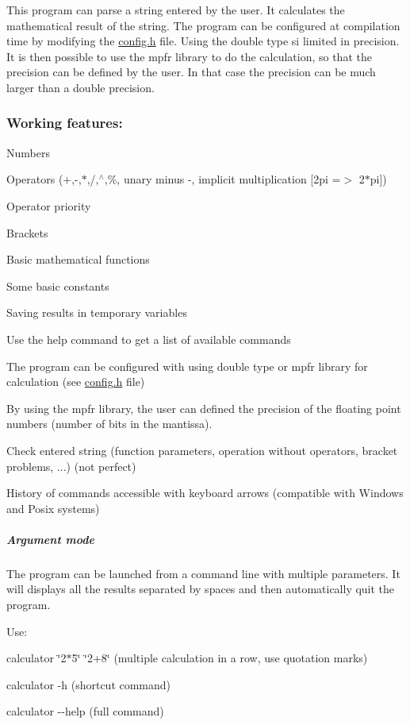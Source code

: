 This program can parse a string entered by the user. It calculates the mathematical result of the string. The program can be configured at compilation time by modifying the {\ttfamily \hyperlink{config_8h}{config.\+h}} file. Using the double type si limited in precision. It is then possible to use the mpfr library to do the calculation, so that the precision can be defined by the user. In that case the precision can be much larger than a double precision.

\subsubsection*{Working features\+:}


\begin{DoxyItemize}
\item Numbers
\item Operators (+,-\/,$\ast$,/,$^\wedge$,\%, unary minus -\/, implicit multiplication \mbox{[}2pi =$>$ 2$\ast$pi\mbox{]})
\item Operator priority
\item Brackets
\item Basic mathematical functions
\item Some basic constants
\item Saving results in temporary variables
\item Use the help command to get a list of available commands
\item The program can be configured with using double type or mpfr library for calculation (see \hyperlink{config_8h}{config.\+h} file)
\item By using the mpfr library, the user can defined the precision of the floating point numbers (number of bits in the mantissa).
\item Check entered string (function parameters, operation without operators, bracket problems, ...) (not perfect)
\item History of commands accessible with keyboard arrows (compatible with Windows and Posix systems)
\end{DoxyItemize}

\subparagraph*{Argument mode}

The program can be launched from a command line with multiple parameters. It will displays all the results separated by spaces and then automatically quit the program.
\begin{DoxyItemize}
\item Use\+:
\begin{DoxyItemize}
\item {\ttfamily calculator \char`\"{}2$\ast$5\char`\"{} \char`\"{}2+8\char`\"{}} (multiple calculation in a row, use quotation marks)
\item {\ttfamily calculator -\/h} (shortcut command)
\item {\ttfamily calculator -\/-\/help} (full command)
\end{DoxyItemize}
\end{DoxyItemize}

